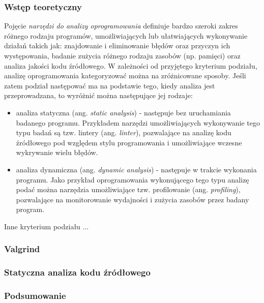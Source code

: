 \subsubsection*{Wstęp teoretyczny}
Pojęcie \emph{narzędzi do analizy oprogramowania} definiuje bardzo szeroki zakres różnego rodzaju programów, umożliwiających lub ułatwiających wykonywanie działań takich jak: znajdowanie i eliminowanie błędów oraz przyczyn ich występowania, badanie zużycia różnego rodzaju zasobów (np. pamięci) oraz analiza jakości kodu źródłowego. W zależności od przyjętego kryterium podziału, analizę oprogramowania kategoryzować można na zróżnicowane sposoby. Jeśli zatem podział następować ma na podstawie tego, kiedy analiza jest przeprowadzana, to wyróżnić można następujące jej rodzaje:
\begin{itemize}
    \item analiza statyczna (ang. \emph{static analysis}) - następuje bez uruchamiania badanego programu. Przykładem narzędzi umożliwiających wykonywanie tego typu badań są tzw. lintery (ang. \emph{linter}), pozwalające na analizę kodu źródłowego pod względem stylu programowania i umożliwiające wczesne wykrywanie wielu błędów.
    \item analiza dynamiczna (ang. \emph{dynamic analysis}) - następuje w trakcie wykonania programu. Jako przykład oprogramowania wykonującego tego typu analizę podać można narzędzia umożliwiające tzw. profilowanie (ang. \emph{profiling}), pozwalające na monitorowanie wydajności i zużycia zasobów przez badany program.
\end{itemize}

Inne kryterium podziału ... 


\subsubsection*{Valgrind}


\subsubsection*{Statyczna analiza kodu źródłowego}


\subsubsection*{Podsumowanie}


